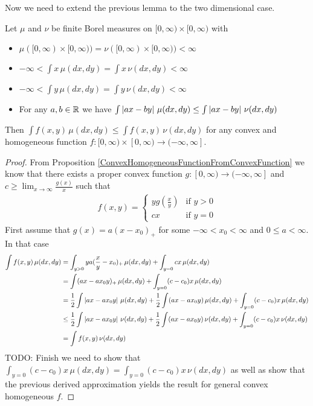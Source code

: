 Now we need to extend the previous lemma to the two dimensional case.  

\begin{lem}\label{BoundConvexHomogeneousViaAffine}Let $\mu$ and $\nu$ be finite Borel measures on $[0, \infty) \times [0,\infty)$ with 
\begin{itemize}
\item[(i)]$\mu([0, \infty) \times [0,\infty)) = \nu([0, \infty) \times [0,\infty)) < \infty$ 
\item[(ii)] $-\infty < \int x \, \mu(dx,dy) = \int x \, \nu(dx,dy) < \infty$ 
\item[(iii)] $-\infty < \int y \, \mu(dx,dy) = \int y \, \nu(dx,dy) < \infty$
\item[(iv)] For any $a,b \in \mathbb{R}$ we have $\int \left \vert ax - by \right \vert \, \mu(dx, dy) \leq \int \left \vert ax - by \right \vert \, \nu(dx,dy)$
\end{itemize}  
Then $\int f(x,y) \, \mu(dx,dy) \leq \int f(x,y) \, \nu(dx,dy)$ for any convex and homogeneous function $f : [0,\infty) \times [0,\infty) \to (-\infty, \infty]$.  
\end{lem}
\begin{proof}
From Proposition \ref{ConvexHomogeneousFunctionFromConvexFunction} we know that there exists a proper convex function $g : [0,\infty) \to (-\infty, \infty]$ and $c \geq \lim_{x \to \infty} \frac{g(x)}{x}$ such that 
\begin{align*}
f(x,y) = \begin{cases}
y g \left( \frac{x}{y} \right ) & \text{if $y>0$} \\
c x & \text{if $y=0$}
\end{cases}
\end{align*}
First assume that $g(x) = a(x - x_0)_+$ for some $-\infty < x_0 < \infty$ and $0 \leq a < \infty$.  In that case
\begin{align*}
\int f(x,y) \, \mu(dx,dy) &= \int_{y > 0} y a (\frac{x}{y} - x_0)_+ \, \mu(dx,dy) + \int_{y = 0} c x \, \mu(dx,dy) \\
&= \int  (a x - a x_0  y )_+ \, \mu(dx,dy) + \int_{y = 0} (c-c_0) x \, \mu(dx,dy) \\
&= \frac{1}{2} \int  \left \vert a x - a x_0  y \right \vert \, \mu(dx,dy) + \frac{1}{2} \int  (a x - a x_0  y ) \, \mu(dx,dy) + \int_{y = 0} (c-c_0) x \, \mu(dx,dy) \\
&\leq \frac{1}{2} \int  \left \vert a x - a x_0  y \right \vert \, \nu(dx,dy) + \frac{1}{2} \int  (a x - a x_0  y ) \, \nu(dx,dy) + \int_{y = 0} (c-c_0) x \, \nu(dx,dy) \\
&=\int f(x,y) \, \nu(dx,dy) 
\end{align*}
 TODO: Finish  we need to show that $\int_{y = 0} (c-c_0) x \, \mu(dx,dy) = \int_{y = 0} (c-c_0) x \, \nu(dx,dy)$ as well as show that the previous derived approximation yields the result for general convex homogeneous $f$.
\end{proof}

